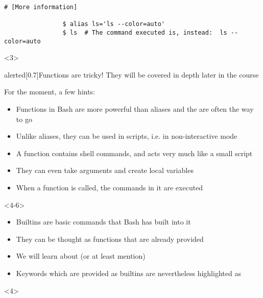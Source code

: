 \begin{frame}
\begin{overlayarea}{\textwidth}{0.7\textheight}
\begin{onlyenv}
\begin{lstlisting}[style=MyBash]
                # [More information]

                $ alias ls='ls --color=auto'
                $ ls  # The command executed is, instead:  ls --color=auto
            \end{lstlisting}
        \end{onlyenv}
        \begin{onlyenv}<3>
            {\Large
            \begin{varblock}{alerted}[0.7\textwidth]{Functions are tricky!}
                They will be covered in depth later in the course
            \end{varblock}}
            \bigskip
            For the moment, a few hints:
            \begin{itemize}
                \item Functions in Bash are more powerful than aliases and the are often the way to go
                \item Unlike aliases, they can be used in scripts, i.e. in non-interactive mode
                \item A function contains shell commands, and acts very much like a small script
                \item They can even take arguments and create local variables
                \item When a function is called, the commands in it are executed
            \end{itemize}
        \end{onlyenv}
        \begin{onlyenv}<4-6>
            \begin{itemize}
                \item Builtins are basic commands that Bash has built into it
                \item They can be thought as functions that are already provided
                \item We will learn about (or at least mention) 
                \item Keywords which are provided as builtins are nevertheless highlighted as 
            \end{itemize}
            \begin{onlyenv}<4>
                \begin{lstlisting}[style=MyBash, numbers=none, keywordstyle=\color{builtins-color},]

\end{lstlisting}
\end{onlyenv}
\end{onlyenv}
\end{overlayarea}
\end{frame}
